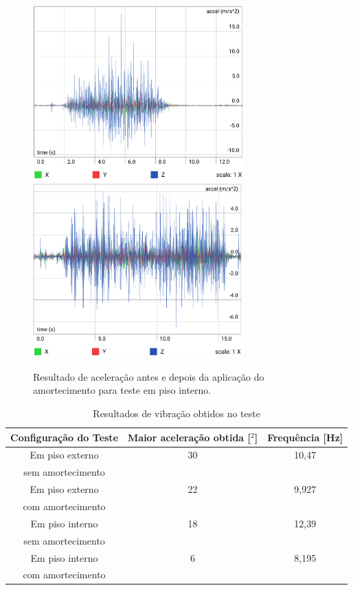 \begin{figure}[H]
	\centering
	\includegraphics[height=190pt]{figuras/piso_int_sem_amortecimento.png}
	\includegraphics[height=190pt]{figuras/piso_int_com_amortecimento.png}
	\caption{Resultado de aceleração antes e depois da aplicação do amortecimento para teste em piso interno.}
\end{figure}

\begin{table}[H]
	\centering
	\caption{Resultados de vibração obtidos no teste}
	\label{vibteste}
	\begin{tabular}{|c|c|c|}
		\hline
		\textbf{Configuração do Teste}    & \textbf{Maior aceleração obtida [$^2$]} & \textbf{Frequência [Hz]} \\ \hline
		Em piso externo   & 30        & 10,47           \\
		sem amortecimento &                    &            \\ \hline
		Em piso externo   & 22        & 9,927           \\
		com amortecimento &                    &            \\ \hline
		Em piso interno   & 18        & 12,39           \\ 
		sem amortecimento &                    &            \\ \hline
		Em piso interno   & 6         & 8,195           \\
		com amortecimento &                    &            \\ \hline
	\end{tabular}
\end{table}

